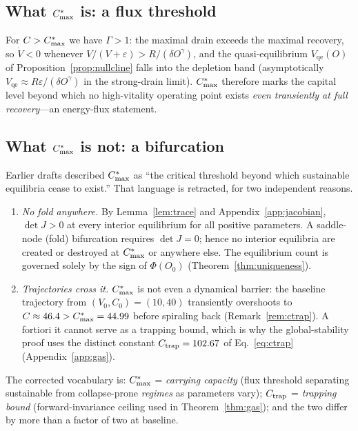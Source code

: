 \subsection{What $C^{*}_{\max}$ is: a flux threshold}

For $C>C^{*}_{\max}$ we have $\Gamma>1$: the maximal drain exceeds the maximal
recovery, so $\dot V<0$ whenever $V/(V+\varepsilon)>R/(\delta O^{\gamma})$,
and the quasi-equilibrium $V_{\mathrm{qe}}(O)$ of
Proposition~\ref{prop:nullcline} falls into the depletion band
(asymptotically $V_{\mathrm{qe}}\approx R\varepsilon/(\delta O^{\gamma})$
in the strong-drain limit). $C^{*}_{\max}$ therefore marks the capital level
beyond which no high-vitality operating point exists \emph{even
transiently at full recovery}---an energy-flux statement.

\subsection{What $C^{*}_{\max}$ is not: a bifurcation}

Earlier drafts described $C^{*}_{\max}$ as ``the critical threshold beyond which
sustainable equilibria cease to exist.'' That language is retracted, for
two independent reasons.

\begin{enumerate}
\item \emph{No fold anywhere.} By Lemma~\ref{lem:trace} and
Appendix~\ref{app:jacobian}, $\det J>0$ at every interior equilibrium for
all positive parameters. A saddle-node (fold) bifurcation requires
$\det J=0$; hence no interior equilibria are created or destroyed at
$C^{*}_{\max}$ or anywhere else. The equilibrium count is governed solely by the
sign of $\Phi(O_0)$ (Theorem~\ref{thm:uniqueness}).
\item \emph{Trajectories cross it.} $C^{*}_{\max}$ is not even a dynamical
barrier: the baseline trajectory from $(V_0,C_0)=(10,40)$ transiently
overshoots to $C\approx46.4>C^{*}_{\max}=44.99$ before spiraling back
(Remark~\ref{rem:ctrap}). A fortiori it cannot serve as a trapping bound,
which is why the global-stability proof uses the distinct constant
$C_{\mathrm{trap}}=102.67$ of Eq.~\eqref{eq:ctrap}
(Appendix~\ref{app:gas}).
\end{enumerate}

The corrected vocabulary is: $C^{*}_{\max}$ = \emph{carrying capacity} (flux
threshold separating sustainable from collapse-prone \emph{regimes} as
parameters vary); $C_{\mathrm{trap}}$ = \emph{trapping bound} (forward-invariance
ceiling used in Theorem~\ref{thm:gas}); and the two differ by more than a
factor of two at baseline.
